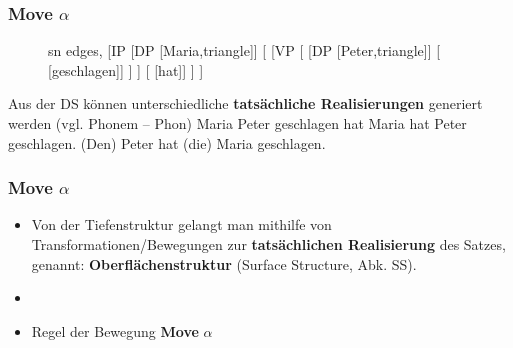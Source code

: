 \begin{frame}
\frametitle{Move $\alpha$}

\begin{figure}[b]
  	\begin{minipage}[b]{0.70\textwidth}
	\centering
	\scriptsize{
		\begin{forest}
		sn edges,
		[IP [DP [Maria,triangle]]
			[ 
				[VP 
					[ 
						[DP [Peter,triangle]]
						[ [geschlagen]]
					]
				]
				[ [hat]]
			]
		]
		\end{forest}
		}
  	\end{minipage}  
\end{figure}

Aus der DS können unterschiedliche \textbf{tatsächliche Realisierungen} generiert werden (vgl. Phonem -- Phon)
\eal
\ex Maria Peter geschlagen hat
\ex Maria hat Peter geschlagen.
\ex (Den) Peter hat (die) Maria geschlagen.
\zl

\end{frame}


\begin{frame}
\frametitle{Move $\alpha$}

\begin{itemize}
	\item Von der Tiefenstruktur gelangt man mithilfe von Transformationen/Bewegungen zur \textbf{tatsächlichen Realisierung} des Satzes, genannt: \textbf{Oberflächenstruktur} (Surface Structure, Abk. SS).
	\item[]
	\item Regel der Bewegung \ras \textbf{Move} $\alpha$
\end{itemize}

\end{frame}


